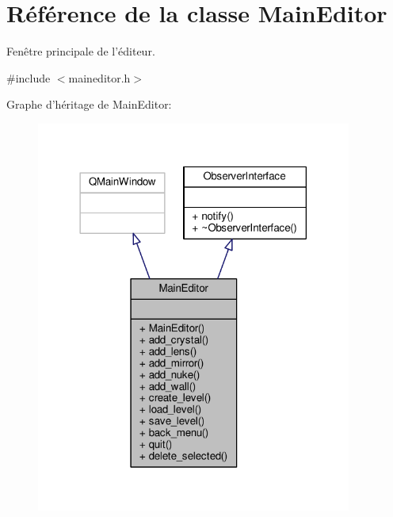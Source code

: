 \hypertarget{classMainEditor}{\section{Référence de la classe Main\+Editor}
\label{classMainEditor}
}


Fenêtre principale de l’éditeur.  




{\ttfamily \#include $<$maineditor.\+h$>$}



Graphe d'héritage de Main\+Editor\+:
\nopagebreak
\begin{figure}[H]
\begin{center}
\leavevmode
\includegraphics[width=294pt]{d1/d27/classMainEditor__inherit__graph}
\end{center}
\end{figure}


